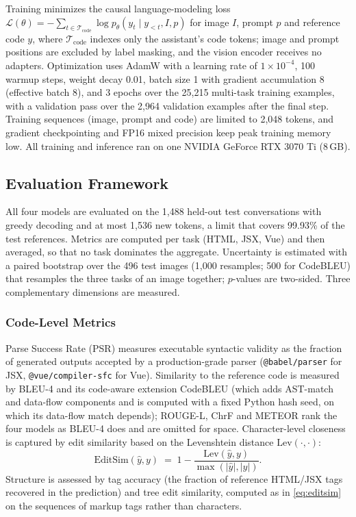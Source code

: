\documentclass[conference,a4paper]{IEEEtran}
\begin{document}
Training minimizes the causal language-modeling loss
$\mathcal{L}(\theta) = -\sum_{t \in \mathcal{T}_{\mathrm{code}}} \log p_\theta(y_t \mid y_{<t}, I, p)$
for image $I$, prompt $p$ and reference code $y$, where
$\mathcal{T}_{\mathrm{code}}$ indexes only the assistant's code tokens; image
and prompt positions are excluded by label masking, and the vision encoder
receives no adapters.
Optimization uses AdamW with a learning rate of $1{\times}10^{-4}$, 100 warmup
steps, weight decay 0.01, batch size 1 with gradient accumulation 8 (effective
batch 8), and 3 epochs over the 25,215 multi-task training examples, with a
validation pass over the 2,964 validation examples after the final step.
Training sequences (image, prompt and code) are limited to 2,048 tokens, and
gradient checkpointing and FP16 mixed precision keep peak training memory low.
All training and inference ran on one NVIDIA GeForce RTX 3070 Ti (8\,GB).

\subsection{Evaluation Framework}
\label{subsec:eval}

All four models are evaluated on the 1,488 held-out test conversations with
greedy decoding and at most 1,536 new tokens, a limit that covers 99.93\% of
the test references. Metrics are computed
per task (HTML, JSX, Vue) and then averaged, so that no task dominates the
aggregate. Uncertainty is estimated with a paired bootstrap over the 496 test
images (1,000 resamples; 500 for CodeBLEU) that resamples the three tasks of an
image together; $p$-values are two-sided. Three complementary dimensions are measured.

\subsubsection{Code-Level Metrics}
Parse Success Rate (PSR) measures executable syntactic validity as the
fraction of generated outputs accepted by a production-grade parser
(\texttt{@babel/parser} for JSX, \texttt{@vue/compiler-sfc} for Vue).
Similarity to the reference code is measured by BLEU-4 \cite{papineni2002bleu} and its code-aware
extension CodeBLEU \cite{ren2020codebleu} (which adds AST-match and data-flow components and is
computed with a fixed Python hash seed, on which its data-flow match depends); ROUGE-L,
ChrF and METEOR rank the four models as BLEU-4 does and are omitted for
space. Character-level closeness is captured by edit
similarity based on the Levenshtein distance $\mathrm{Lev}(\cdot,\cdot)$:
\begin{equation}
\mathrm{EditSim}(\hat{y}, y) \;=\;
1 - \frac{\mathrm{Lev}(\hat{y}, y)}{\max\!\left(|\hat{y}|, |y|\right)} .
\label{eq:editsim}
\end{equation}
Structure is assessed by tag accuracy (the fraction of reference HTML/JSX tags
recovered in the prediction) and tree edit similarity, computed as in
\eqref{eq:editsim} on the sequences of markup tags rather than characters.
\end{document}
